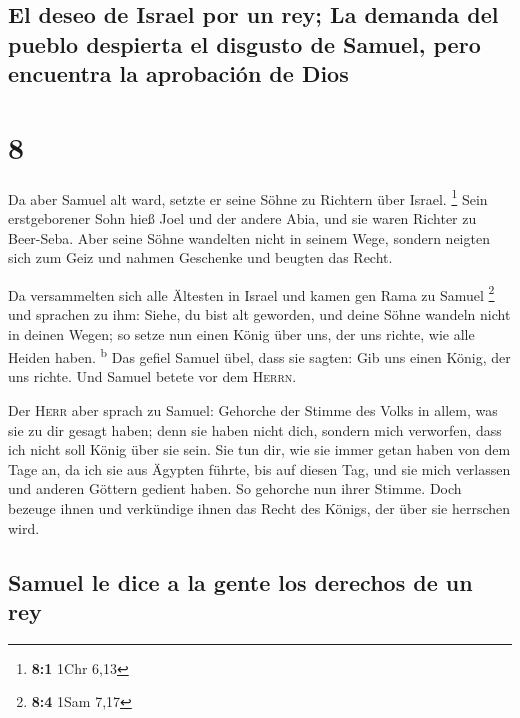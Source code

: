 \hypertarget{el-deseo-de-israel-por-un-rey-la-demanda-del-pueblo-despierta-el-disgusto-de-samuel-pero-encuentra-la-aprobaciuxf3n-de-dios}{%
\subsection{El deseo de Israel por un rey; La demanda del pueblo
despierta el disgusto de Samuel, pero encuentra la aprobación de
Dios}\label{el-deseo-de-israel-por-un-rey-la-demanda-del-pueblo-despierta-el-disgusto-de-samuel-pero-encuentra-la-aprobaciuxf3n-de-dios}}

\hypertarget{section-7}{%
\section{8}\label{section-7}}

 Da aber Samuel alt ward, setzte er seine Söhne zu
Richtern über Israel. \footnote{\textbf{8:1} 1Chr 6,13} 
Sein erstgeborener Sohn hieß Joel und der andere Abia, und sie waren
Richter zu Beer-Seba.  Aber seine Söhne wandelten nicht in
seinem Wege, sondern neigten sich zum Geiz und nahmen Geschenke und
beugten das Recht.

 Da versammelten sich alle Ältesten in Israel und kamen
gen Rama zu Samuel \footnote{\textbf{8:4} 1Sam 7,17}  und
sprachen zu ihm: Siehe, du bist alt geworden, und deine Söhne wandeln
nicht in deinen Wegen; so setze nun einen König über uns, der uns
richte, wie alle Heiden haben. \textsuperscript{b}  Das
gefiel Samuel übel, dass sie sagten: Gib uns einen König, der uns
richte. Und Samuel betete vor dem \textsc{Herrn}.

 Der \textsc{Herr} aber sprach zu Samuel: Gehorche der
Stimme des Volks in allem, was sie zu dir gesagt haben; denn sie haben
nicht dich, sondern mich verworfen, dass ich nicht soll König über sie
sein.  Sie tun dir, wie sie immer getan haben von dem Tage
an, da ich sie aus Ägypten führte, bis auf diesen Tag, und sie mich
verlassen und anderen Göttern gedient haben.  So gehorche
nun ihrer Stimme. Doch bezeuge ihnen und verkündige ihnen das Recht des
Königs, der über sie herrschen wird.

\hypertarget{samuel-le-dice-a-la-gente-los-derechos-de-un-rey}{%
\subsection{Samuel le dice a la gente los derechos de un
rey}\label{samuel-le-dice-a-la-gente-los-derechos-de-un-rey}}


